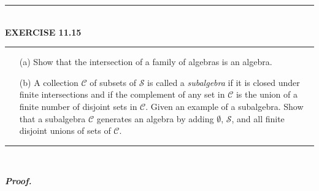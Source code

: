\documentclass[a4paper,11pt]{article}
\begin{document}
	\begin{flushleft}
		\rule[-0.5ex]{17cm}{2pt}\\
			\textbf{EXERCISE 11.15}\\
		\rule[1.5ex]{17cm}{0.5pt}
		\begin{enumerate}
			\item [(a)] Show that the intersection of a family of algebras is an algebra.

			\item [(b)] A collection $\mathscr{C}$ of subsets of $\mathscr{S}$ is called a \textit{subalgebra} if it is closed under finite intersections and if the complement of any set in $\mathscr{C}$ is the union of a finite number of disjoint sets in $\mathscr{C}$. Given an example of a subalgebra. Show that a subalgebra $\mathscr{C}$ generates an algebra by adding $\emptyset$, $\mathscr{S}$, and all finite disjoint unions of sets of $\mathscr{C}$.
		\end{enumerate}
		\rule[1.0ex]{17cm}{0.5pt}\
	\end{flushleft}
	\textbf{\textit{Proof.}}
\end{document}
